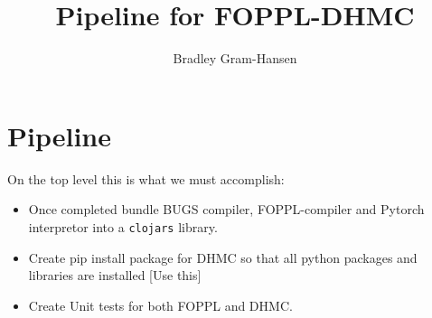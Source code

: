 \documentclass[]{article}
\title{Pipeline for FOPPL-DHMC}
\author{Bradley Gram-Hansen}
\begin{document}
\maketitle

\begin{abstract}

\end{abstract}

\section{Pipeline}
On the top level this is what we must accomplish:
\begin{itemize}
	\item Once completed bundle BUGS compiler, FOPPL-compiler and Pytorch interpretor into a \texttt{clojars} library. 
	\item Create pip install package for DHMC so that all python packages and libraries are installed \href{http://the-hitchhikers-guide-to-packaging.readthedocs.io/en/latest/creation.html}[Use this]
	\item Create Unit tests for both FOPPL and DHMC.
\end{itemize}
\end{document}
